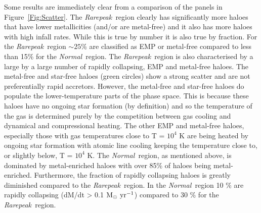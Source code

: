 \documentclass[graphics, twocolumn, usenatbib]{mn2e}
\newcommand{\msolaryrc} {$\rm{M_{\odot}~yr^{-1}}$}
\newcommand{\rarepeak} {\textit{Rarepeak~}}
\newcommand{\normal} {\textit{Normal~}}
\begin{document}
Some results are immediately clear from a comparison of the panels in Figure~\ref{Fig:Scatter}.
The \rarepeak region clearly has significantly more haloes that have lower
metallicities (and/or are metal-free) and it also has more haloes
with high infall rates. While this is true by number it is also true by fraction.
For the \rarepeak region $\sim 25$\% are classified as EMP or metal-free compared to
less than 15\% for the \normal region. The \rarepeak region is also characterised by a
large by a large number of rapidly collapsing, EMP and metal-free haloes. 
The metal-free and star-free haloes (green circles) show a strong scatter and are not preferentially
rapid accretors. However, the metal-free and star-free haloes do populate the lower-temperature parts of the
phase space. This is because these haloes have no ongoing star formation (by definition) and so
the temperature of the gas is determined purely by the competition between gas cooling and
dynamical and compressional heating. The other EMP and metal-free haloes, especially those with gas temperatures
close to T = $10^4$ K are being heated by ongoing star formation with atomic line
cooling keeping the temperature close to, or slightly below, T = $10^4$ K. 
The \normal region, as mentioned above, is dominated by metal-enriched haloes with over 85\% of haloes being metal-enriched.
Furthermore, the fraction of rapidly collapsing haloes is greatly diminished compared to the \rarepeak region. In the
\normal region 10 \% are rapidly collapsing (dM/dt > 0.1 \msolaryrc) compared to 30 \% for the \rarepeak region.
\end{document}
